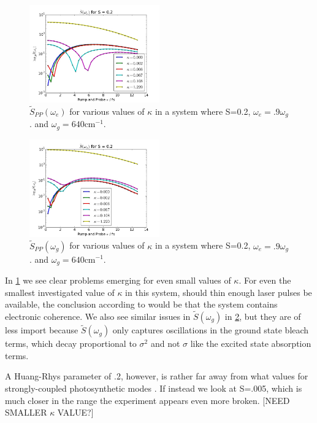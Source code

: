\begin{figure}
   \includegraphics[width=0.5\textwidth]{images/s0point2_omega_e.jpg}
   \caption{$\tilde{S}_{PP} ( \omega_e)$ for various values of $\kappa$ in a system where S=0.2, $\omega_e = .9 \omega_g$. and $\omega_g = 640 \text{cm}^{-1}$.  }
	\label{fig:detunedMediumExcited}
\end{figure}

\begin{figure}
   \includegraphics[width=0.5\textwidth]{images/s0point2_omega_g.jpg}
   \caption{$\tilde{S}_{PP} ( \omega_g)$ for various values of $\kappa$ in a system where S=0.2, $\omega_e = .9 \omega_g$. and $\omega_g = 640 \text{cm}^{-1}$.  }
	\label{fig:detunedMediumGround}
\end{figure}

In \ref{fig:detunedMediumExcited} we see clear problems emerging for even small values of $\kappa$.  For even the smallest investigated value of $\kappa$ in this system, should thin enough laser pulses be available, the conclusion according to \cite{allanWitness} would be that the system contains electronic coherence.  We also see similar issues in $\tilde{S} ( \omega_g)$ in \ref{fig:detunedMediumGround}, but they are of less import because $\tilde{S} ( \omega_g ) $ only captures oscillations in the ground state bleach terms, which decay proportional to $\sigma^2$ and not $\sigma$ like the  excited state absorption terms.

A Huang-Rhys parameter of .2, however, is rather far away from what values for strongly-coupled photosynthetic modes \cite{typicalStwo}.  If instead we look at S=.005, which is much closer in the range the experiment appears even more broken. [NEED SMALLER $\kappa$ VALUE?] %

